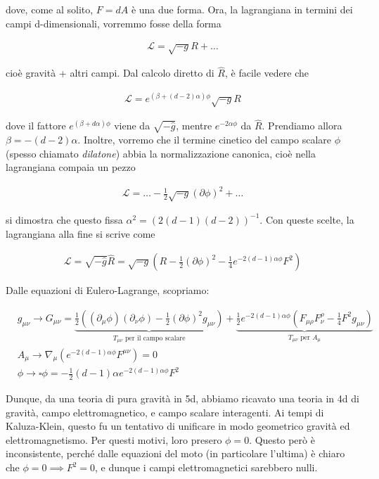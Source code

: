 \documentclass{report}
\begin{document}
dove, come al solito, \(F = dA\) è una due forma. Ora, la lagrangiana in termini dei campi d-dimensionali, vorremmo fosse della forma 

\begin{align}
    \mathcal{L} = \sqrt{-g}R + \ldots 
\end{align}

cioè gravità + altri campi. Dal calcolo diretto di \(\hat{R}\), è facile vedere che 

\begin{align}
    \mathcal{L} = e^{(\beta + (d-2)\alpha)\phi}\sqrt{-g}R 
\end{align}

dove il fattore \(e^{(\beta +d\alpha)\phi}\) viene da \(\sqrt{-\hat{g}}\), mentre \(e^{-2\alpha \phi}\) da \(\hat{R}\). Prendiamo allora \(\beta = -(d-2)\alpha\). Inoltre, vorremo che il termine cinetico del campo scalare \(\phi\) (spesso chiamato \emph{dilatone}) abbia la normalizzazione canonica, cioè nella lagrangiana compaia un pezzo 

\begin{align}
    \mathcal{L} = \ldots -\frac{1}{2}\sqrt{-g}(\partial\phi)^2 + \ldots
\end{align}

si dimostra che questo fissa \(\alpha^2 = (2(d-1)(d-2))^{-1}\). Con queste scelte, la lagrangiana alla fine si scrive come 

\begin{align}
    \mathcal{L} = \sqrt{-\hat{g}}\hat{R} = \sqrt{-g}\left(R - \frac{1}{2}(\partial\phi)^2 -\frac{1}{4}e^{-2(d-1)\alpha\phi} F^2\right)
\end{align}

Dalle equazioni di Eulero-Lagrange, scopriamo: 

\begin{align}
    &g_{\mu\nu} \rightarrow G_{\mu\nu} = \underbrace{\frac{1}{2}((\partial_\mu\phi)(\partial_\nu\phi) - \frac{1}{2}(\partial\phi)^2g_{\mu\nu})}_{T_{\mu\nu} \text{ per il campo scalare}} + \underbrace{\frac{1}{2}e^{-2(d-1)\alpha\phi}(F_{\mu\rho}F_\nu^\rho - \frac{1}{4}F^2 g_{\mu\nu})}_{T_{\mu\nu} \text{ per } A_\mu} \\
    &A_{\mu} \rightarrow \nabla_\mu(e^{-2(d-1)\alpha\phi}F^{\mu\nu}) = 0 \\
    &\phi \rightarrow \square\phi = -\frac{1}{2}(d-1)\alpha e^{-2(d-1)\alpha\phi}F^2
\end{align}

Dunque, da una teoria di pura gravità in 5d, abbiamo ricavato una teoria in 4d di gravità, campo elettromagnetico, e campo scalare interagenti. Ai tempi di Kaluza-Klein, questo fu un tentativo di unificare in modo geometrico gravità ed elettromagnetismo. Per questi motivi, loro presero \(\phi = 0\). Questo però è inconsistente, perché dalle equazioni del moto (in particolare l'ultima) è chiaro che \(\phi = 0 \implies F^2 = 0\), e dunque i campi elettromagnetici sarebbero nulli.  
\end{document}
